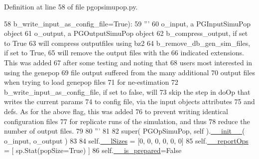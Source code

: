 Definition at line 58 of file pgopsimupop.\+py.


\begin{DoxyCode}
58                                     b\_write\_input\_as\_config\_file=\textcolor{keyword}{True}):  
59         \textcolor{stringliteral}{'''}
60 \textcolor{stringliteral}{            o\_input, a PGInputSimuPop object}
61 \textcolor{stringliteral}{            o\_output, a PGOutputSimuPop object}
62 \textcolor{stringliteral}{            b\_compress\_output, if set to True}
63 \textcolor{stringliteral}{                will compress outputfiles using bz2}
64 \textcolor{stringliteral}{            b\_remove\_db\_gen\_sim\_files, if set to True,}
65 \textcolor{stringliteral}{                will remove the output files with the}
66 \textcolor{stringliteral}{                indicated extensions.  This was added}
67 \textcolor{stringliteral}{                after some testing and noting that}
68 \textcolor{stringliteral}{                users most interested in using the genepop}
69 \textcolor{stringliteral}{                file output suffered from the many additional}
70 \textcolor{stringliteral}{                output files when trying to load genepop files}
71 \textcolor{stringliteral}{                for ne-estimation}
72 \textcolor{stringliteral}{            b\_write\_input\_as\_config\_file, if set to false, will }
73 \textcolor{stringliteral}{                skip the step in doOp that writes the current params}
74 \textcolor{stringliteral}{                to config file, via the input objects attributes }
75 \textcolor{stringliteral}{                and defs. As for the above flag, this was added}
76 \textcolor{stringliteral}{                to prevent writing identical configuration files}
77 \textcolor{stringliteral}{                for replicate runs of the simulation, and thus}
78 \textcolor{stringliteral}{                reduce the number of output files. }
79 \textcolor{stringliteral}{}
80 \textcolor{stringliteral}{        '''}
81 
82         super( PGOpSimuPop, self ).\hyperlink{classnegui_1_1pgopsimupop_1_1PGOpSimuPop_a6548b8996f7ace76266e629d9ff8c11e}{\_\_init\_\_}( o\_input, o\_output )
83 
84         self.\hyperlink{classnegui_1_1pgopsimupop_1_1PGOpSimuPop_a1061b53dea80371a6414760b43b2cd1e}{\_\_lSizes} = [0, 0, 0, 0, 0, 0]
85         self.\hyperlink{classnegui_1_1pgopsimupop_1_1PGOpSimuPop_a1224d81cfdf1400b2f12970074c81817}{\_\_reportOps} = [ sp.Stat(popSize=\textcolor{keyword}{True}) ]
86         self.\hyperlink{classnegui_1_1pgopsimupop_1_1PGOpSimuPop_ac10f21f990f51e85c7fab2b5aa888edd}{\_\_is\_prepared}=\textcolor{keyword}{False}

\end{DoxyCode}
